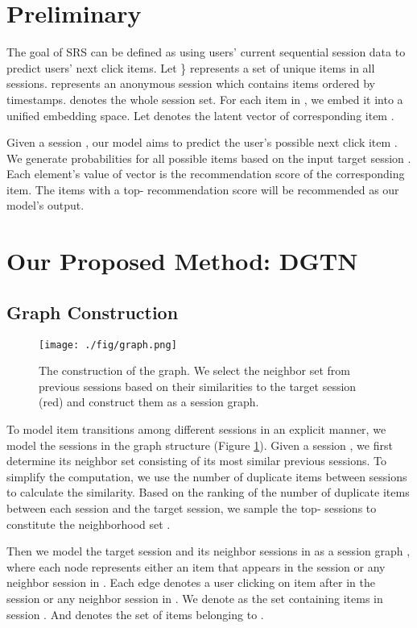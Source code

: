 \documentclass[conference]{IEEEtran}
\begin{document}
\section{Preliminary}
\label{p}
The goal of SRS can be defined as using users’ current sequential session data to predict users’ next click items. Let \} represents a set of unique items in all sessions. 
 represents an anonymous session which contains items ordered by timestamps.  denotes the whole session set. 
For each item in , we embed it into a unified embedding space. 
Let  denotes the latent vector of corresponding item .


Given a session , our model aims to predict the user's possible next click item . We generate probabilities  for all possible items based on the input target session . Each element's value of vector  is the recommendation score of the corresponding item. The items with a top- recommendation score will be recommended as our model's output.

\section{Our Proposed Method: DGTN}
\label{m}


 
\subsection{Graph Construction}

\begin{figure}[t]
\centering
\texttt{[image: ./fig/graph.png]} \caption{The construction of the graph. We select the neighbor set  from previous sessions based on their similarities to the target session (red) and construct them as a session graph. }
\label{fig:graph}
\vspace{-2mm}
\end{figure}
To model item transitions among different sessions in an explicit manner, we model the sessions in the graph structure (Figure \ref{fig:graph}).
Given a session , we first determine its neighbor set  consisting of its  most similar previous sessions. 
To simplify the computation, we use the number of duplicate items between sessions to calculate the similarity. Based on the ranking of the number of duplicate items between each session and the target session, we sample the top- sessions to constitute the neighborhood set .



Then we model the target session  and its neighbor sessions in  as a session graph , where each node represents either an item that appears in the session  or any neighbor session in .
Each edge  denotes a user clicking on item  after  in the session  or any neighbor session in . 
We denote  as the set containing items in session . And  denotes the set of items belonging to .
\end{document}
